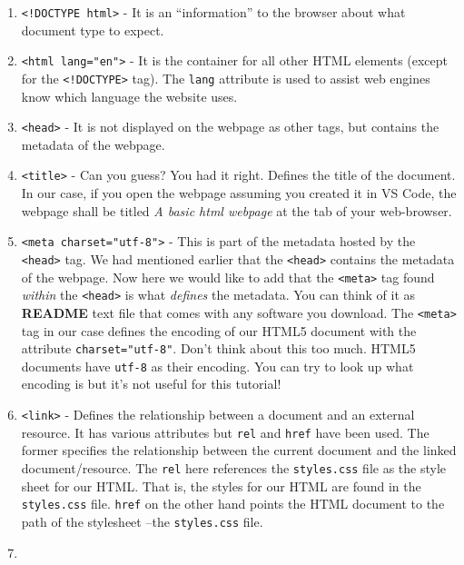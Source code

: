 \documentclass[
]{book}
\begin{document}
\begin{enumerate}
\def\labelenumi{\arabic{enumi}.}
\item
  \texttt{\textless{}!DOCTYPE\ html\textgreater{}} - It is an ``information'' to the browser about what document type to expect.
\item
  \texttt{\textless{}html\ lang="en"\textgreater{}} - It is the container for all other HTML elements (except for the \texttt{\textless{}!DOCTYPE\textgreater{}} tag). The \texttt{lang} attribute is used to assist web engines know which language the website uses.
\item
  \texttt{\textless{}head\textgreater{}} - It is not displayed on the webpage as other tags, but contains the metadata of the webpage.
\item
  \texttt{\textless{}title\textgreater{}} - Can you guess? You had it right. Defines the title of the document. In our case, if you open the webpage assuming you created it in VS Code, the webpage shall be titled \emph{A basic html webpage} at the tab of your web-browser.
\item
  \texttt{\textless{}meta\ charset="utf-8"\textgreater{}} - This is part of the metadata hosted by the \texttt{\textless{}head\textgreater{}} tag. We had mentioned earlier that the \texttt{\textless{}head\textgreater{}} contains the metadata of the webpage. Now here we would like to add that the \texttt{\textless{}meta\textgreater{}} tag found \emph{within} the \texttt{\textless{}head\textgreater{}} is what \emph{defines} the metadata. You can think of it as \textbf{README} text file that comes with any software you download. The \texttt{\textless{}meta\textgreater{}} tag in our case defines the encoding of our HTML5 document with the attribute \texttt{charset="utf-8"}. Don't think about this too much. HTML5 documents have \texttt{utf-8} as their encoding. You can try to look up what encoding is but it's not useful for this tutorial!
\item
  \texttt{\textless{}link\textgreater{}} - Defines the relationship between a document and an external resource. It has various attributes but \texttt{rel} and \texttt{href} have been used. The former specifies the relationship between the current document and the linked document/resource. The \texttt{rel} here references the \texttt{styles.css} file as the style sheet for our HTML. That is, the styles for our HTML are found in the \texttt{styles.css} file. \texttt{href} on the other hand points the HTML document to the path of the stylesheet --the \texttt{styles.css} file.
\item

\end{enumerate}
\end{document}
